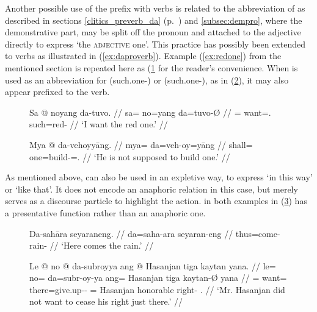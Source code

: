 Another possible use of the prefix  with verbs is related to the
abbreviation of  as described in sections
\ref{clitics_preverb_da} (p.~\pageref{clitics_preverb_da}) and
\ref{subsec:dempro}, where the demonstrative part,  may be split
off the pronoun and attached to the adjective directly to express `the
\textsc{adjective} one'. This practice has possibly been extended to verbs as
illustrated in (\ref{ex:daproverb}). Example (\ref{ex:redone}) from the
mentioned section is repeated here as (\ref{ex:redone_2} for the reader's
convenience. When  is used as an abbreviation for
 (such.one-\Parg{}) or 
(such.one-\PargI{}), as in (\ref{ex:davb2}), it may also appear prefixed to the
verb.

\begin{figure}[h]
\ex\label{ex:redone_2}\begingl
	\gla Sa @ noyang da-tuvo. //
	\glb sa= no=yang da=tuvo-Ø //
	\glc \PatT{}= want=\Fsg{}.\Aarg{} such=red-\Top{} //
	\glft `I want the red one.' //
\endgl\xe
\end{figure}

\begin{figure}[h]
\ex\label{ex:davb2}\begingl
	\gla Mya @ da-vehoyyāng. //
	\glb mya= da=veh-oy=yāng //
	\glc shall= one=build-\Neg{}=\Tsg.\M{} //
	\glft `He is not supposed to build one.' //
\endgl\xe
\end{figure}

As mentioned above,  can also be used in an expletive way, to
express `in this way' or `like that'. It does not encode an anaphoric relation
in this case, but merely serves as a discourse particle to highlight the
action.  in both examples in (\ref{ex:daexpl}) has a presentative
function rather than an anaphoric one.

\begin{figure}[h]
\pex\label{ex:daexpl}
\a\begingl
	\gla Da-sahāra seyaraneng. //
	\glb da=saha-ara seyaran-eng //
	\glc thus=come-\TsgI{} rain-\AargI{} //
	\glft `Here comes the rain.' //
\endgl

\a\begingl
	\gla Le @ no @ da-subroyya ang @ Hasanjan tiga kaytan yana. //
	\glb le= no= da=subr-oy-ya ang= Hasanjan tiga kaytan-Ø yana //
	\glc \PatT{}= want= there=give.up-\Neg{}-\TsgM{} \Aarg{}= Hasanjan 
		honorable right-\Top{} \TsgM{}.\Gen{} //
	\glft `Mr. Hasanjan did not want to cease his right just there.' //
\endgl
\xe
\end{figure}

